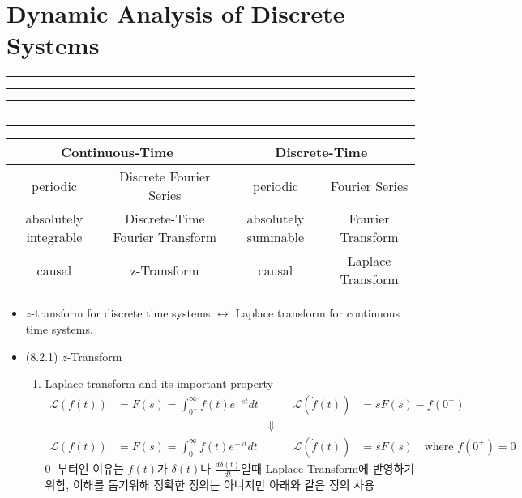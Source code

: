\setcounter{chapter}{7}
\setcounter{section}{1}
\section{Dynamic Analysis of Discrete Systems}
\vspace{-8pt} \hrule \hrule \hrule \hrule \hrule  \vspace{12pt}


\begin{table}[!h]
\centering

\begin{tabular}{|cccc|}
\hline

\multicolumn{2}{|c|}{Continuous-Time}                                      & \multicolumn{2}{c|}{Discrete-Time}   \\ \hline
\multicolumn{1}{|c|}{periodic}              & \multicolumn{1}{c|}{Discrete Fourier Series}         & \multicolumn{1}{c|}{periodic}            & Fourier Series    \\ \hline
\multicolumn{1}{|c|}{absolutely integrable} & \multicolumn{1}{c|}{Discrete-Time Fourier Transform} & \multicolumn{1}{c|}{absolutely summable} & Fourier Transform \\ \hline
\multicolumn{1}{|c|}{causal}                & \multicolumn{1}{c|}{z-Transform}                     & \multicolumn{1}{c|}{causal}              & Laplace Transform \\ \hline
\end{tabular}
\end{table}
\begin{itemize}
	\item $z$-transform for discrete time systems $\leftrightarrow$ Laplace transform for continuous time systems. 
\item (8.2.1) $z$-Transform 
	\begin{enumerate}
		\item Laplace transform and its important property 
		\begin{align*}
			\mathcal{L} (f(t))&= F(s) = \int_{0^-}^{\infty} f(t) e^{-st} dt 
			&&&
			\mathcal{L}(\dot{f}(t)) &= sF(s) -f(0^{-})\\
			&&\Downarrow&
			\\
						\mathcal{L} (f(t))&= F(s) = \int_0^{\infty} f(t) e^{-st} dt 
			&&&
			\mathcal{L}(\dot{f}(t)) &= sF(s) \text{ } \text{ where $f(0^+) = 0$}
		\end{align*}
		$0^{-}$부터인 이유는 $f(t)$가 $\delta(t)$나 $\frac{d\delta(t)}{dt}$일때 Laplace Transform에 반영하기 위함, 이해를 돕기위해 정확한 정의는 아니지만 아래와 같은 정의 사용
	\end{enumerate}	
\end{itemize}


